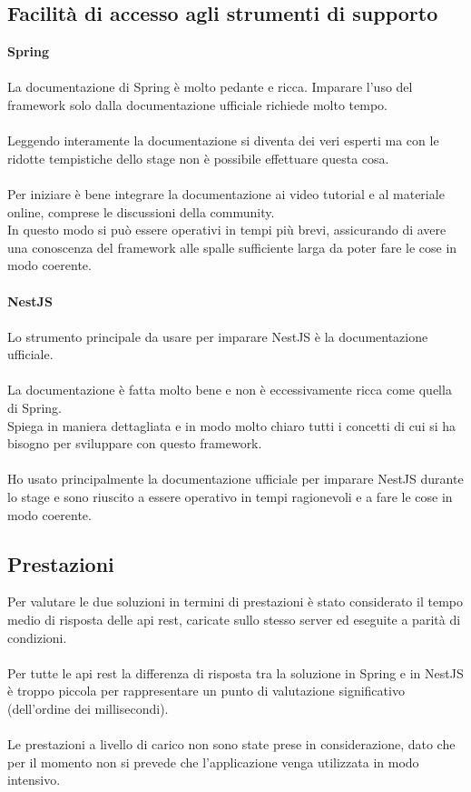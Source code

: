 \subsection{Facilità di accesso agli strumenti di supporto}
\textbf{Spring}
\\\\
La documentazione di Spring è molto pedante e ricca. Imparare l'uso del framework solo dalla documentazione 
ufficiale richiede molto tempo. 
\\\\
Leggendo interamente la documentazione si diventa dei veri esperti ma con le ridotte tempistiche
dello stage non è possibile effettuare questa cosa.
\\\\
Per iniziare è bene integrare la documentazione ai video tutorial e al materiale online, comprese le discussioni 
della community. 
\\
In questo modo si può essere operativi in tempi più brevi, assicurando di avere una conoscenza
del framework alle spalle sufficiente larga da poter fare le cose in modo coerente.
\\\\
\textbf{NestJS}
\\\\
Lo strumento principale da usare per imparare NestJS è la documentazione ufficiale.
\\\\
La documentazione è fatta molto bene e non è eccessivamente ricca come quella di Spring. 
\\
Spiega in maniera dettagliata
e in modo molto chiaro tutti i concetti di cui si ha bisogno per sviluppare con questo framework.
\\\\
Ho usato principalmente la documentazione ufficiale per imparare NestJS durante lo stage e sono riuscito a essere
operativo in tempi ragionevoli e a fare le cose in modo coerente.

\subsection{Prestazioni}
Per valutare le due soluzioni in termini di prestazioni è stato considerato il tempo medio di risposta delle \gls{api} \gls{rest}, 
caricate sullo stesso 
server ed eseguite a parità di condizioni.
\\\\
Per tutte le \gls{api} \gls{rest} la differenza di risposta tra la soluzione in Spring e in NestJS è troppo piccola per rappresentare un punto
di valutazione significativo (dell'ordine dei millisecondi).
\\\\
Le prestazioni a livello di carico non sono state prese in considerazione, dato che per il momento non si prevede che l'applicazione 
venga utilizzata in modo intensivo.

